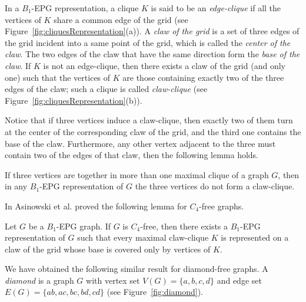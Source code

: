 In  a $B_1$-EPG representation, a clique $K$  is said to be
 an \textit{edge-clique} if all the vertices of $K$ share a common edge of the grid (see Figure~\ref{fig:cliquesRepresentation}(a)).
 A \textit{claw of the grid} is a set of three edges of the grid incident into a same point of the grid, which is called
  the \textit{center of the claw}. The two edges of the claw that have the same direction form
    the \textit{ base of the claw}. If $K$ is not an edge-clique, then there exists
    a claw of the grid (and only one) such that the vertices of $K$ are those containing exactly two of the three edges of the claw; such a  clique is called  \textit{claw-clique} \cite{golumbic2009} (see Figure~\ref{fig:cliquesRepresentation}(b)).

    
    

Notice that if three vertices induce a claw-clique, then exactly two of them turn at the center of the corresponding  claw of the grid, and the third one contains the
base of the claw. 
Furthermore, any other vertex  adjacent to the three  must contain two of the edges of that claw, then the following lemma holds.

\begin{lema}\label{lem:cliquesMaximais}
If three vertices are together  in more than one maximal clique of a graph $G$, then in
any $B_1$-EPG representation of $G$ the three vertices do not form a claw-clique. %
\end{lema}



In \cite{ries2009} Asinowski et al. proved the following lemma for $C_4$-free graphs.

\begin{lema} \cite{ries2009} \label{lem:lemaBRies2009}
Let $G$ be a $B_1$-EPG graph. If $G$ is $C_4$-free, then there exists a $B_1$-EPG representation of $G$ such that every  maximal claw-clique $K$ is represented on a claw of the grid whose base is covered only by vertices of $K$.
\end{lema}


We have obtained the following similar result for diamond-free graphs. A \textit{diamond} is a graph $G$ with vertex set $V(G) = \{a, b, c, d\}$ and edge set $E(G)=\{ab, ac,bc, bd,cd\}$ (see Figure~\ref{fig:diamond}). %




